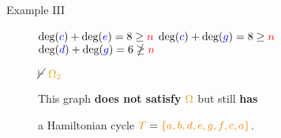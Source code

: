 \documentclass[pdf]{beamer}
\newcommand{\n}{\textcolor{red}{n}}
\newcommand{\T}{\textcolor{orange}{T}}
\newcommand{\bluec}{\textcolor{blue}{c}}
\newcommand{\blued}{\textcolor{blue}{d}}
\newcommand{\bluee}{\textcolor{blue}{e}}
\newcommand{\blueg}{\textcolor{blue}{g}}
\newcommand{\ore}{\textcolor{gold}{\Omega}}
\newcommand{\oresecondcond}{\textcolor{gold}{\Omega_2}}
\newcommand{\gdeg}{\text{deg}}
\begin{document}
\begin{frame}{Example III}
\begin{figure}
{            $\gdeg(\bluec) + \gdeg(\bluee) = 8 \geq \n$ \quad
            $\gdeg(\bluec) + \gdeg(\blueg) = 8 \geq \n$ \quad
            $\gdeg(\blued) + \gdeg(\blueg) = 6 \ngeq \n$}

            $\cancel\vdash \text{ } \oresecondcond$

            \pause

            \vspace{5px}

            This graph \textbf{does not satisfy} $\ore$ but still \textbf{has}
            
            a Hamiltonian cycle $\T = \textcolor{orange}{\{a,b,d,e,g,f,c,a\}}$.
        \end{figure}
    \end{frame}

\end{document}
